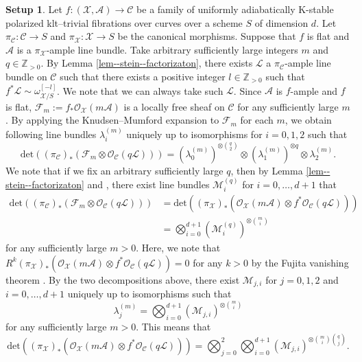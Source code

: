 \documentclass[12pt,twoside]{amsart}
\theoremstyle{definition}
\newtheorem{setup}[thm]{Setup}
\begin{document}
\begin{setup}\label{setup--62}
Let $f\colon (\mathcal{X},\mathcal{A})\to \mathcal{C}$ be a family of uniformly adiabatically K-stable polarized klt--trivial fibrations over curves over a scheme $S$ of dimension $d$.
Let $\pi_{\mathcal{C}}\colon \mathcal{C}\to S$ and $\pi_{\mathcal{X}}\colon \mathcal{X}\to S$ be the canonical morphisms.
Suppose that $f$ is flat and $\mathcal{A}$ is a $\pi_{\mathcal{X}}$-ample line bundle.
Take arbitrary sufficiently large integers $m$ and $q\in\mathbb{Z}_{>0}$.
By Lemma \ref{lem--stein--factorizaton}, there exists $\mathcal{L}$ a $\pi_{\mathcal{C}}$-ample line bundle on $\mathcal{C}$ such that there exists a positive integer $l\in\mathbb{Z}_{>0}$ such that $f^*\mathcal{L}\sim\omega_{\mathcal{X}/S}^{[-l]}$.
We note that we can always take such $\mathcal{L}$.
Since $\mathcal{A}$ is $f$-ample and $f$ is flat, 
$\mathscr{F}_m:=f_*\mathcal{O}_{\mathcal{X}}(m\mathcal{A})$ is a locally free sheaf on $\mathcal{C}$ for any sufficiently large $m$.
By applying the Knudsen--Mumford expansion \cite[Theorem 4]{KnMu} to $\mathscr{F}_m$ for each $m$, we obtain following line bundles $\lambda^{(m)}_i$ uniquely up to isomorphisms for $i=0,1,2$ such that 
\[
\mathrm{det}\left((\pi_{\mathcal{C}})_*(\mathscr{F}_m\otimes\mathcal{O}_{\mathcal{C}}(q\mathcal{L}))\right)=(\lambda^{(m)}_0)^{\otimes \binom{q}{2}}\otimes (\lambda^{(m)}_1)^{\otimes q}\otimes \lambda^{(m)}_2.
\]
We note that if we fix an arbitrary sufficiently large $q$, then by Lemma \ref{lem--stein--factorizaton} and \cite[Theorem 4]{KnMu}, there exist line bundles $\mathcal{M}^{(q)}_{i}$ for $i=0,\ldots,d+1$ that
\begin{align*}
\mathrm{det}\left((\pi_{\mathcal{C}})_*(\mathscr{F}_m\otimes\mathcal{O}_{\mathcal{C}}(q\mathcal{L}))\right)&=\mathrm{det}\left((\pi_{\mathcal{X}})_*(\mathcal{O}_{\mathcal{X}}(m\mathcal{A})\otimes f^*\mathcal{O}_{\mathcal{C}}(q\mathcal{L}))\right)\\
&=\bigotimes_{i=0}^{d+1}(\mathcal{M}^{(q)}_{i})^{\otimes \binom{m}{i}}
\end{align*}
for any sufficiently large $m>0$.
Here, we note that $R^k(\pi_{\mathcal{X}})_*(\mathcal{O}_{\mathcal{X}}(m\mathcal{A})\otimes f^*\mathcal{O}_{\mathcal{C}}(q\mathcal{L}))=0$ for any $k>0$ by the Fujita vanishing theorem \cite[Theorem 1.4.35]{Laz}.
By the two decompositions above, there exist $\mathcal{M}_{j,i}$ for $j=0,1,2$ and $i=0,\ldots,d+1$ uniquely up to isomorphisms such that 
\[
\lambda_j^{(m)}=\bigotimes_{i=0}^{d+1}(\mathcal{M}_{j,i})^{\otimes\binom{m}{i}}
\]
for any sufficiently large $m>0$. 
This means that 
\[
\mathrm{det}\left((\pi_{\mathcal{X}})_*(\mathcal{O}_{\mathcal{X}}(m\mathcal{A})\otimes f^*\mathcal{O}_{\mathcal{C}}(q\mathcal{L}))\right)=\bigotimes_{j=0}^2\bigotimes_{i=0}^{d+1}(\mathcal{M}_{j,i})^{\otimes\binom{m}{i}\binom{q}{j}}.
\]



\end{setup}
\end{document}
